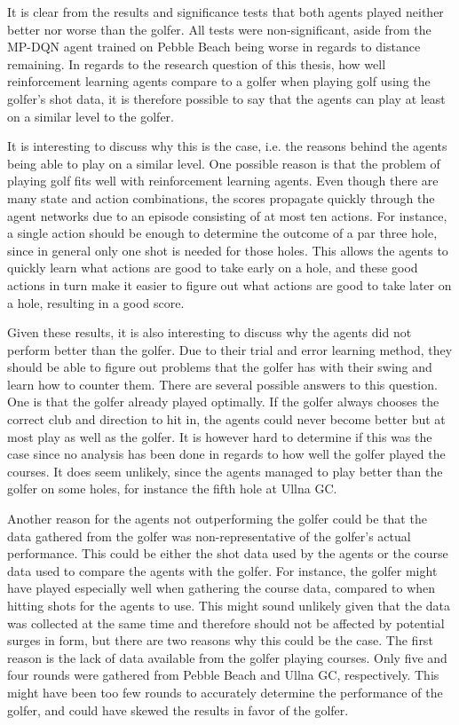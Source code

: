 \documentclass{kththesis}
\begin{document}
It is clear from the results and significance tests that both agents played neither better nor worse than the golfer. All tests were non-significant, aside from the MP-DQN agent trained on Pebble Beach being worse in regards to distance remaining. In regards to the research question of this thesis, how well reinforcement learning agents compare to a golfer when playing golf using the golfer's shot data, it is therefore possible to say that the agents can play at least on a similar level to the golfer.

It is interesting to discuss why this is the case, i.e. the reasons behind the agents being able to play on a similar level. One possible reason is that the problem of playing golf fits well with reinforcement learning agents. Even though there are many state and action combinations, the scores propagate quickly through the agent networks due to an episode consisting of at most ten actions. For instance, a single action should be enough to determine the outcome of a par three hole, since in general only one shot is needed for those holes. This allows the agents to quickly learn what actions are good to take early on a hole, and these good actions in turn make it easier to figure out what actions are good to take later on a hole, resulting in a good score.

Given these results, it is also interesting to discuss why the agents did not perform better than the golfer. Due to their trial and error learning method, they should be able to figure out problems that the golfer has with their swing and learn how to counter them. There are several possible answers to this question. One is that the golfer already played optimally. If the golfer always chooses the correct club and direction to hit in, the agents could never become better but at most play as well as the golfer. It is however hard to determine if this was the case since no analysis has been done in regards to how well the golfer played the courses. It does seem unlikely, since the agents managed to play better than the golfer on some holes, for instance the fifth hole at Ullna GC. 

Another reason for the agents not outperforming the golfer could be that the data gathered from the golfer was non-representative of the golfer's actual performance. This could be either the shot data used by the agents or the course data used to compare the agents with the golfer. For instance, the golfer might have played especially well when gathering the course data, compared to when hitting shots for the agents to use. This might sound unlikely given that the data was collected at the same time and therefore should not be affected by potential surges in form, but there are two reasons why this could be the case. The first reason is the lack of data available from the golfer playing courses. Only five and four rounds were gathered from Pebble Beach and Ullna GC, respectively. This might have been too few rounds to accurately determine the performance of the golfer, and could have skewed the results in favor of the golfer.
\end{document}
